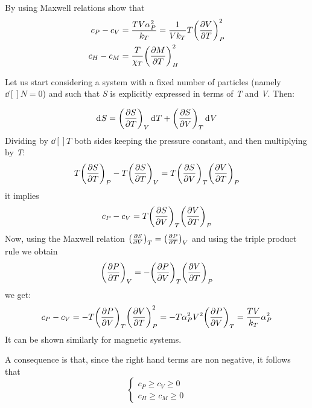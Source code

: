 \documentclass[../main/main.tex]{subfiles}
\begin{document}
\begin{exercise}{}{}
By using Maxwell relations show that
\begin{subequations}
\begin{align}
  c_P - c_V &= \frac{T V \alpha_P ^2}{k_T} = \frac{1}{V k_T} T \qty(\pdv{V}{T} )_P^2 \\
  c_H - c_M &= \frac{T}{\chi _T} \qty(\pdv{M}{T} )_H^2
\end{align}
\end{subequations}
\begin{solution}
Let us start considering a system with a fixed number of particles (namely \( \dd[]{N} =0  \)) and such that \emph{S}  is explicitly expressed in terms of \emph{T}  and \emph{V}.
Then:

\begin{equation*}
  \dd[]{S} = \qty(\pdv{S}{T})_V \dd[]{T} + \qty(\pdv{S}{V} )_T \dd[]{V}
\end{equation*}
Dividing by \( \dd[]{T}  \) both sides keeping the pressure constant, and then multiplying by \emph{T}:
\begin{equation*}
  T \qty(\pdv{S}{T} )_P - T \qty(\pdv{S}{T} )_V = T \qty(\pdv{S}{V} )_T \qty(\pdv{V}{T} )_P
\end{equation*}
it implies
\begin{equation*}
  c_P - c_V = T \qty(\pdv{S}{V} )_T \qty(\pdv{V}{T} )_P
\end{equation*}
Now, using the Maxwell relation \( \qty(\pdv{S}{V} )_T = \qty(\pdv{P}{T} )_V   \) and using the triple product rule we obtain
\begin{equation*}
  \qty(\pdv{P}{T} )_V = - \qty(\pdv{P}{V} )_T \qty(\pdv{V}{T} )_P
\end{equation*}
we get:
\begin{equation*}
  c_P-c_V = - T \qty(\pdv{P}{V} )_T \qty(\pdv{V}{T} )_P^2 =
  -T  \alpha_P^2 V^2 \qty(\pdv{P}{V} )_T
  =\frac{T V}{k_T} \alpha_P^2
\end{equation*}
It can be shown similarly for magnetic systems.
\end{solution}
 A consequence is that, since the right hand terms are non negative,  it follows that
\begin{equation}
  \begin{cases}
   c_P \ge c_V \ge 0  \\
   c_H \ge c_M \ge 0
  \end{cases}
\end{equation}
\end{exercise}
\end{document}
